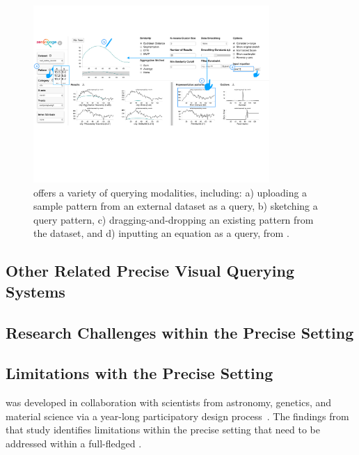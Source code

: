 \begin{figure}[h!]
\centering
\includegraphics[width=0.8\textwidth]{figures/modalities.pdf}
\caption{\zv offers a variety of querying modalities, including: a) uploading a sample pattern from an external dataset as a query, b) sketching a query pattern, c) dragging-and-dropping an existing pattern from the dataset, and d) inputting an equation as a query, from \cite{Lee2017}.}
\label{fig:modalities}
\end{figure}


\subsection{Other Related Precise Visual Querying Systems}


\subsection{Research Challenges within the Precise Setting}




\subsection{Limitations with the Precise Setting}
\par \zv was developed in collaboration with
scientists from astronomy, genetics, 
and material science via a year-long 
participatory design process~\cite{Lee2017}. 
The findings from that study identifies 
limitations within
the precise setting that need to be addressed
within a full-fledged \vida.


